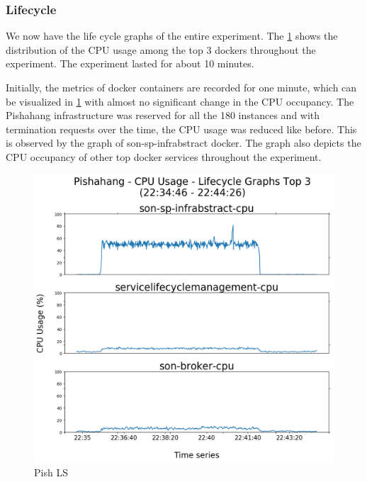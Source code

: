 \subsubsection{Lifecycle}

We now have the life cycle graphs of the entire experiment. The \ref{fig:pishahang-top-3-lifecycle} shows the distribution of the CPU usage among the top 3 dockers throughout the experiment. The experiment lasted for about 10 minutes.

Initially, the metrics of docker containers are recorded for one minute, which can be visualized in \ref{fig:pishahang-top-3-lifecycle} with almost no significant change in the CPU occupancy. The Pishahang infrastructure was reserved for all the 180 instances and with termination requests over the time, the CPU usage was reduced like before. This is observed by the graph of son-sp-infrabstract docker. The graph also depicts the CPU occupancy of other top docker services throughout the experiment.


\begin{figure}[h]
	\centering
	\includegraphics[width=0.7\linewidth]{figures/scalability_graphs/Lifecycle-Graphs-Top-3/Pishahang-TOP-3-Lifecycle}
	\caption{Pish LS}
	\label{fig:pishahang-top-3-lifecycle}
\end{figure}
